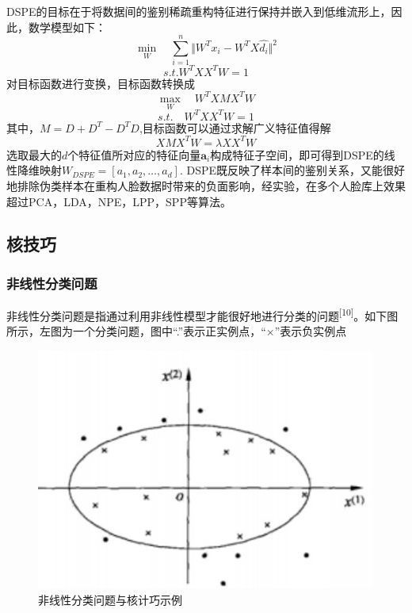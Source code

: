 \documentclass[bachelor,zhspacing]{cqu}  %
\begin{document}
DSPE的目标在于将数据间的鉴别稀疏重构特征进行保持并嵌入到低维流形上，因此，数学模型如下：
\[\min_{W}\quad\sum_{i=1}^{n}\Vert{W^{T}x_{i}-W^{T}X\hat{d_{i}}}\Vert^{2}\]
\[s.t. W^{T}XX^{T}W=1\] 对目标函数进行变换，目标函数转换成
\[\max_{W}\quad W^{T}XMX^{T}W\] \[s.t.\quad W^{T}XX^{T}W=1\]
其中，\(M=D+D^{T}-D^{T}D\),目标函数可以通过求解广义特征值得解
\[XMX^{T}W=\lambda XX^{T}W\]
选取最大的\(d\)个特征值所对应的特征向量\(\mathbf{a}_{i}\)构成特征子空间，即可得到DSPE的线性降维映射\(W_{DSPE}=[a_{1},a_{2},\ldots,a_{d}].\)
DSPE既反映了样本间的鉴别关系，又能很好地排除伪类样本在重构人脸数据时带来的负面影响，经实验，在多个人脸库上效果超过PCA，LDA，NPE，LPP，SPP等算法。

\subsection{核技巧}\label{ux6838ux6280ux5de7}

\subsubsection{非线性分类问题}\label{ux975eux7ebfux6027ux5206ux7c7bux95eeux9898}

非线性分类问题是指通过利用非线性模型才能很好地进行分类的问题\textsuperscript{{[}10{]}}。如下图所示，左图为一个分类问题，图中``.''表示正实例点，``\(\times\)''表示负实例点

\begin{figure}[htbp]
\centering
\includegraphics{pic/ellipse.png}
\caption{非线性分类问题与核计巧示例}
\end{figure}
\end{document}
